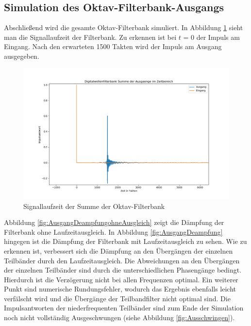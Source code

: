 \subsection{Simulation des Oktav-Filterbank-Ausgangs}
Abschließend wird die gesamte Oktav-Filterbank simuliert. In Abbildung \ref{fig:OktavLaufzeit} sieht man die Signallaufzeit der Filterbank. Zu erkennen ist bei $t$ = 0 der Impuls am Eingang. Nach den erwarteten 1500 Takten wird der Impuls am Ausgang ausgegeben.\par
\begin{figure}[h!]
	\centering	\includegraphics[width=14cm]{img/bank_zeit_summe.png}
	\caption{Signallaufzeit der Summe der Oktav-Filterbank}
	\label{fig:OktavLaufzeit}
\end{figure}
Abbildung \ref{fig:AusgangDeampfungohneAusgleich} zeigt die Dämpfung der Filterbank ohne Laufzeitausgleich. In Abbildung \ref{fig:AusgangDeampfung} hingegen ist die Dämpfung der Filterbank mit Laufzeitausgleich zu sehen. Wie zu erkennen ist, verbessert sich die Dämpfung an den Übergängen der einzelnen Teilbänder durch den Laufzeitausgleich. Die Abweichungen an den Übergängen der einzelnen Teilbänder sind durch die unterschiedlichen Phasengänge bedingt. Hierdurch ist die Verzögerung nicht bei allen Frequenzen optimal. Ein weiterer Punkt sind numerische Rundungsfehler, wodurch das Ergebnis ebenfalls leicht verfälscht wird und die Übergänge der Teilbandfilter nicht optimal sind. Die Impulsantworten der niederfrequenten Teilbänder sind zum Ende der Simulation noch nicht vollständig Ausgeschwungen (siehe Abbildung \ref{fig:Ausschwingen}). 
